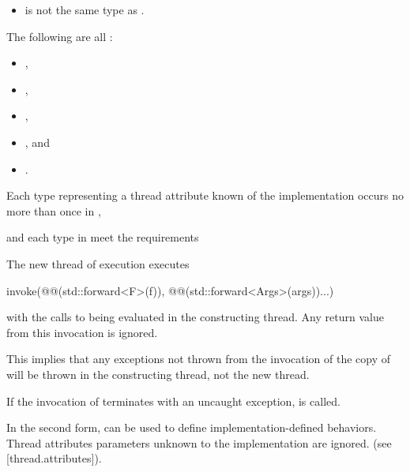 \documentclass{wg21}
\begin{document}
\begin{itemdescr}
\pnum
\constraints
\begin{itemize}
\item {} is not the same type as .
\end{itemize}
\pnum
\mandates
The following are all :
\begin{itemize}
    \item {},
    \item {},
    \item {},
    \item {}, and
    \item {}.
\end{itemize}

\begin{addedblock}
Each type representing a thread attribute known of the implementation occurs no more than once in ,
\end{addedblock}

\pnum
\expects
{} and each type in  meet the
 requirements

\pnum
\effects
The new thread of execution executes
\begin{codeblock}
    invoke(@@(std::forward<F>(f)), @@(std::forward<Args>(args))...)
\end{codeblock}
with the calls to
 being evaluated in the constructing thread.
Any return value from this invocation is ignored.
\begin{note}
    This implies that any exceptions not thrown from the invocation of the copy
    of  will be thrown in the constructing thread, not the new thread.
\end{note}
If the invocation of  terminates with an uncaught exception,
 is called.

\begin{addedblock}
In the second form,  can be used to define implementation-defined behaviors. Thread attributes parameters unknown to the implementation are ignored. (see [thread.attributes]).
\end{addedblock}


\end{itemdescr}
\end{document}
